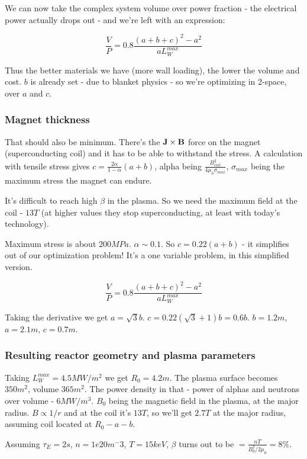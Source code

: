 \documentclass[PlasmaNotes.tex]{subfiles}
\begin{document}
We can now take the complex system volume over power fraction - the electrical power actually drops out - and we're left with an expression:

\[
 \frac{V}{P} = 0.8 \frac{(a+b+c)^2-a^2}{a L_W^{max}}
\]

Thus the better materials we have (more wall loading), the lower the volume and cost. $b$ is already set - due to blanket physics - so we're optimizing in 2-space, over $a$ and $c$.

\subsubsection{Magnet thickness}

That should also be minimum. There's the $\mathbf{J} \times \mathbf{B}$ force on the magnet (superconducting coil) and it has to be able to withstand the stress. A calculation with tensile stress gives $c=\frac{2\alpha}{1-\alpha}(a+b)$, alpha being $\frac{B_{coil}^2}{4\mu_0 \sigma_{max}}$, $\sigma_{max}$ being the maximum stress the magnet can endure.

It's difficult to reach high $\beta$ in the plasma. So we need the maximum field at the coil - $13 T$ (at higher values they stop superconducting, at least with today's technology).

Maximum stress is about $200 MPa$. $\alpha \sim 0.1$. So $c=0.22(a+b)$ - it simplifies out of our optimization problem! It's a one variable problem, in this simplified version.

\[
 \frac{V}{P} = 0.8 \frac{(a+b+c)^2-a^2}{a L_W^{max}}
\]

Taking the derivative we get $a=\sqrt{3} b$. $c=0.22(\sqrt{3}+1)b=0.6b$. $b=1.2m$, $a=2.1m$, $c=0.7m$.

\subsubsection{Resulting reactor geometry and plasma parameters}

Taking $L_W^{max} = 4.5 MW/m^2$ we get $R_0 = 4.2m$. The plasma surface becomes $350m^2$, volume $365m^2$. The power density in that - power of alphas and neutrons over volume - $6 MW/m^3$. $B_0$ being the magnetic field in the plasma, at the major radius. $B \propto 1/r$ and at the coil it's $13 T$, so we'll get $2.7 T$ at the major radius, assuming coil located at $R_0-a-b$.

Assuming $\tau_E = 2s$, $n=1e20 m^-3$, $T=15 keV$, $\beta$ turns out to be $= \frac{n T}{B_0^2/2\mu_0} = 8\%$.
\end{document}
